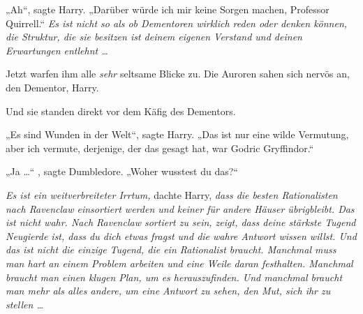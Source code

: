 „Ah“, sagte Harry.
„Darüber würde ich mir keine Sorgen machen, Professor Quirrell.“ \emph{Es ist nicht so als ob Dementoren wirklich reden oder denken können, die Struktur, die sie besitzen ist deinem eigenen Verstand und deinen Erwartungen entlehnt …}

Jetzt warfen ihm alle \emph{sehr} seltsame Blicke zu. Die Auroren sahen sich nervös an, den Dementor, Harry.

Und sie standen direkt vor dem Käfig des Dementors.

„Es sind Wunden in der Welt“, sagte Harry.
„Das ist nur eine wilde Vermutung, aber ich vermute, derjenige, der das gesagt hat, war Godric Gryffindor.“

„Ja …“ , sagte Dumbledore.
„Woher wusstest du das?“

\emph{Es ist ein weitverbreiteter Irrtum,} dachte Harry, \emph{dass die besten Rationalisten nach Ravenclaw einsortiert werden und keiner für andere Häuser übrigbleibt. Das ist nicht wahr. Nach Ravenclaw sortiert zu sein, zeigt, dass deine stärkste Tugend Neugierde ist, dass du dich etwas fragst und die wahre Antwort wissen willst. Und das ist nicht die \emph{einzige} Tugend, die ein Rationalist braucht. Manchmal muss man hart an einem Problem arbeiten und eine Weile daran festhalten. Manchmal braucht man einen klugen Plan, um es herauszufinden. Und manchmal braucht man mehr als alles andere, um eine Antwort zu sehen, den Mut, sich ihr zu stellen …}

